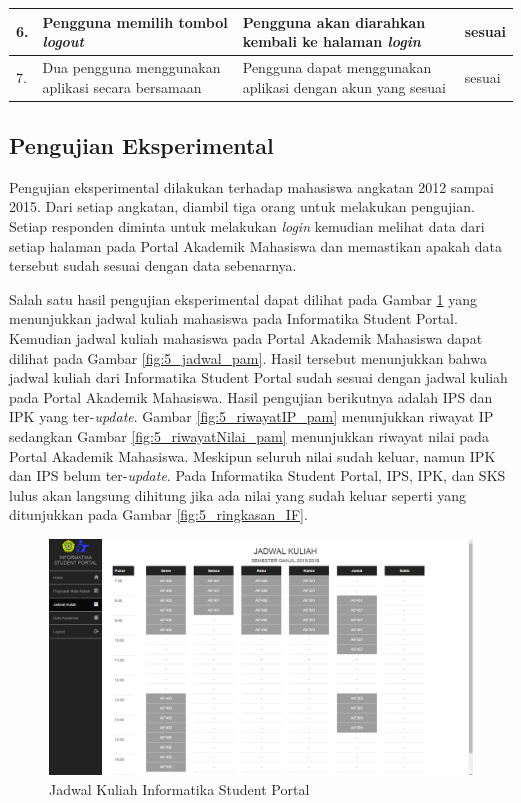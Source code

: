 \begin{table}[H]
\begin{tabular}{|p{0.25cm}| p{3.5cm}| p{7cm}| p{2.5cm}|}
				6.	&	Pengguna memilih tombol \textit{logout}	&	Pengguna akan diarahkan kembali ke halaman \textit{login} &	sesuai	\\ \hline
				7.	& Dua pengguna menggunakan aplikasi secara bersamaan	&	Pengguna dapat menggunakan aplikasi dengan akun yang sesuai &	sesuai	\\ \hline
				\end{tabular}
				\label{table:hasilFungsional}
			\end{table}
			
		\subsection{Pengujian Eksperimental} 
		Pengujian eksperimental dilakukan terhadap mahasiswa angkatan 2012 sampai 2015. Dari setiap angkatan, diambil tiga orang untuk melakukan pengujian. Setiap responden diminta untuk melakukan \textit{login} kemudian melihat data dari setiap halaman pada Portal Akademik Mahasiswa dan memastikan apakah data tersebut sudah sesuai dengan data sebenarnya. 
		
		Salah satu hasil pengujian eksperimental dapat dilihat pada Gambar \ref{fig:5_jadwal_if} yang menunjukkan jadwal kuliah mahasiswa pada Informatika Student Portal.  Kemudian jadwal kuliah mahasiswa pada Portal Akademik Mahasiswa dapat dilihat pada Gambar \ref{fig:5_jadwal_pam}. Hasil tersebut menunjukkan bahwa jadwal kuliah dari Informatika Student Portal sudah sesuai dengan jadwal kuliah pada Portal Akademik Mahasiswa. Hasil pengujian berikutnya adalah IPS dan IPK yang ter-\textit{update}. Gambar \ref{fig:5_riwayatIP_pam} menunjukkan riwayat IP sedangkan Gambar \ref{fig:5_riwayatNilai_pam} menunjukkan riwayat nilai pada Portal Akademik Mahasiswa. Meskipun seluruh nilai sudah keluar, namun IPK dan IPS belum ter-\textit{update}. Pada Informatika Student Portal, IPS, IPK, dan SKS lulus akan langsung dihitung jika ada nilai yang sudah keluar seperti yang ditunjukkan pada Gambar \ref{fig:5_ringkasan_IF}. 
		
		\begin{figure}[H]
			\centering
			\includegraphics[scale=0.34]{Gambar/jadwal_if_eksperimen}
			\caption{Jadwal Kuliah Informatika Student Portal} 
			\label{fig:5_jadwal_if}
		\end{figure}
		
